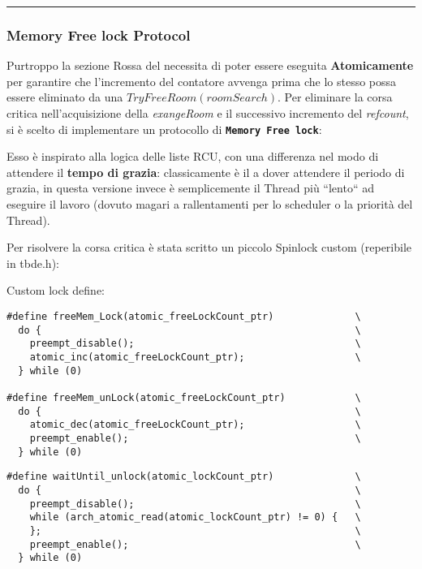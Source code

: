 \rule{\textwidth}{1pt}
\subsubsection{Memory Free lock Protocol}\label{memFreeLockProt}

Purtroppo la sezione {\color{red} Rossa} del  necessita di poter essere
eseguita \textbf{Atomicamente} per garantire che l'incremento del contatore avvenga prima che lo stesso possa essere
eliminato da una {\color{blue}$TryFreeRoom(roomSearch)$}. Per eliminare la corsa critica nell'acquisizione
della \textit{exangeRoom} e il successivo incremento del \textit{refcount}, si è scelto di implementare
un protocollo di \texttt{\textbf{Memory Free lock}}:

Esso è inspirato alla logica delle liste RCU, con una differenza nel modo di attendere il \textbf{tempo di grazia}:
classicamente è il \Writer a dover attendere il periodo di grazia, in questa versione invece è semplicemente il Thread
più ``lento`` ad eseguire il lavoro (dovuto magari a rallentamenti per lo scheduler o la priorità del Thread).

Per risolvere la corsa critica è stata scritto un piccolo Spinlock custom (reperibile in tbde.h):


\begin{indentPar}{2.5cm}
\begin{small}
Custom lock define:
{\color{red}\begin{verbatim}
#define freeMem_Lock(atomic_freeLockCount_ptr)              \
  do {                                                      \
    preempt_disable();                                      \
    atomic_inc(atomic_freeLockCount_ptr);                   \
  } while (0)

#define freeMem_unLock(atomic_freeLockCount_ptr)            \
  do {                                                      \
    atomic_dec(atomic_freeLockCount_ptr);                   \
    preempt_enable();                                       \
  } while (0)
\end{verbatim}}

{\color{blue}\begin{verbatim}
#define waitUntil_unlock(atomic_lockCount_ptr)              \
  do {                                                      \
    preempt_disable();                                      \
    while (arch_atomic_read(atomic_lockCount_ptr) != 0) {   \
    };                                                      \
    preempt_enable();                                       \
  } while (0)
\end{verbatim}}
\end{small}
\end{indentPar}



